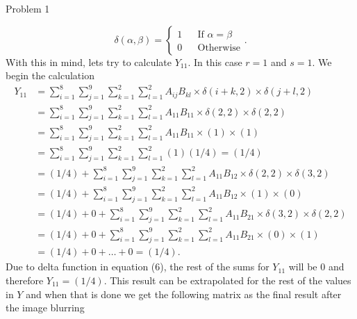 \begin{problem}{Problem 1}
\begin{Highlight}[Solution]
        \begin{equation}
            \delta(\alpha,\beta) = \left\{
                \begin{aligned}
                    1 & & \text{If $\alpha = \beta$} \\
                    0 & & \text{Otherwise}
                \end{aligned}
            \right. .
        \end{equation}
        With this in mind, lets try to calculate $Y_{11}$. In this case $r = 1$ and $s = 1$. We begin the calculation
        \begin{align}
            Y_{11} & = \sum_{i = 1}^{8}\sum_{j = 1}^{9}\sum_{k = 1}^{2}\sum_{l = 1}^{2} A_{ij}B_{kl} \times \delta(i + k, 2) \times \delta(j + l, 2) \\
            & = \sum_{i = 1}^{8}\sum_{j = 1}^{9}\sum_{k = 1}^{2}\sum_{l = 1}^{2} A_{11}B_{11} \times \delta(2, 2) \times \delta(2, 2) \\
            & = \sum_{i = 1}^{8}\sum_{j = 1}^{9}\sum_{k = 1}^{2}\sum_{l = 1}^{2} A_{11}B_{11} \times (1) \times (1) \\
            & = \sum_{i = 1}^{8}\sum_{j = 1}^{9}\sum_{k = 1}^{2}\sum_{l = 1}^{2} (1)(1/4) = (1/4) \\
            & = (1/4) + \sum_{i = 1}^{8}\sum_{j = 1}^{9}\sum_{k = 1}^{2}\sum_{l = 1}^{2} A_{11}B_{12} \times \delta(2, 2) \times \delta(3, 2) \\
            & = (1/4) + \sum_{i = 1}^{8}\sum_{j = 1}^{9}\sum_{k = 1}^{2}\sum_{l = 1}^{2} A_{11}B_{12} \times (1) \times (0) \\
            & = (1/4) + 0 + \sum_{i = 1}^{8}\sum_{j = 1}^{9}\sum_{k = 1}^{2}\sum_{l = 1}^{2} A_{11}B_{21} \times \delta(3, 2) \times \delta(2, 2) \\
            & = (1/4) + 0 + \sum_{i = 1}^{8}\sum_{j = 1}^{9}\sum_{k = 1}^{2}\sum_{l = 1}^{2} A_{11}B_{21} \times (0) \times (1) \\
            & = (1/4) + 0 + \dots + 0 = (1/4).
        \end{align}
        Due to delta function in equation (6), the rest of the sums for $Y_{11}$ will be 0 and therefore $Y_{11} = (1/4)$. This result can be extrapolated for the rest of the values in $Y$ and when that
        is done we get the following matrix as the final result after the image blurring


\end{Highlight}
\end{problem}
